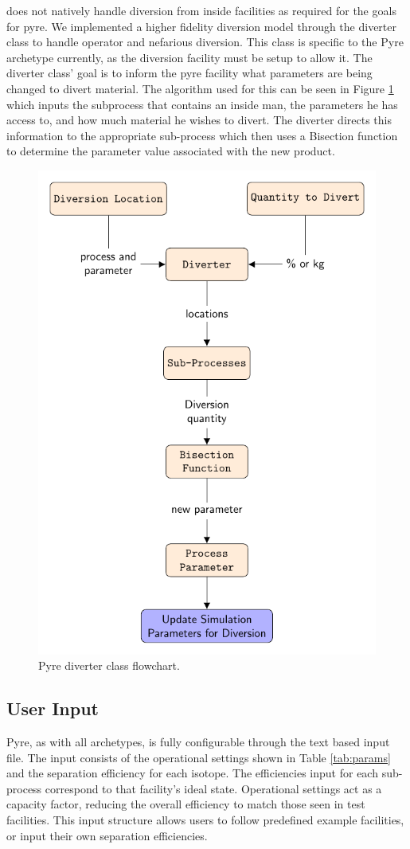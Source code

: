 \Cyclus does not natively handle diversion from inside facilities as required for the goals for pyre. We implemented a higher fidelity diversion model through the
diverter class to handle operator and nefarious diversion. This class is specific to the Pyre archetype currently, as the diversion facility must be setup to allow it.
The diverter class' goal is to inform the pyre facility what parameters are being changed to divert material. The algorithm used for this can be seen in Figure \ref{fig:divflow}
which inputs the subprocess that contains an inside man, the parameters he has access to, and how much material he wishes to divert. The diverter directs this information to the
appropriate sub-process which then uses a Bisection function to determine the parameter value associated with the new product.

\begin{figure}[h]
	\centering
	\includegraphics[width=0.65\linewidth]{images/divertflow}
	\caption{Pyre diverter class flowchart.}
	\label{fig:divflow}
\end{figure}

\subsection{User Input}
Pyre, as with all \Cyclus archetypes, is fully configurable through the text based input file. The input consists of the operational settings shown in Table \ref{tab:params}
and the separation efficiency for each isotope. The efficiencies input for each sub-process correspond to that facility's ideal state. Operational settings act as a capacity factor,
reducing the overall efficiency to match those seen in test facilities. This input structure allows users to follow predefined example facilities, or input their own separation
efficiencies. 

